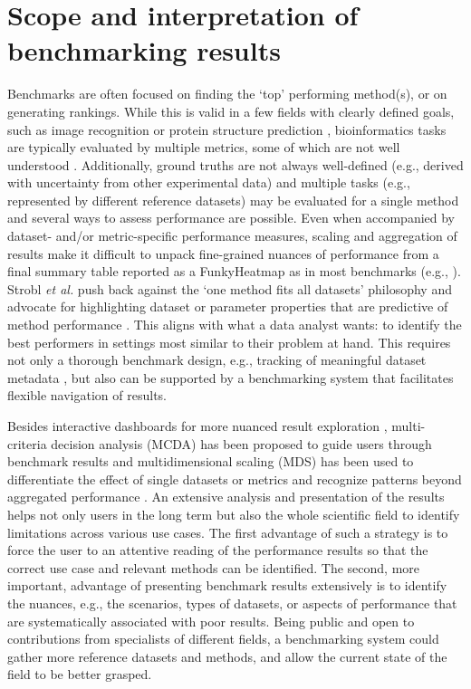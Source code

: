 \documentclass[11pt]{article}
\begin{document}
\section*{Scope and interpretation of benchmarking results}

Benchmarks are often focused on finding the `top' performing method(s), or on generating rankings. While this is valid in a few fields with clearly defined goals, such as image recognition \cite{Khan2018-ot} or protein structure prediction \cite{Jumper2021-oq}, bioinformatics tasks are typically evaluated by multiple metrics, some of which are not well understood \cite{Lutge2021-mt, Reinke2024-dw}. Additionally, ground truths are not always well-defined (e.g., derived with uncertainty from other experimental data) and multiple tasks (e.g., represented by different reference datasets) may be evaluated for a single method and several ways to assess performance are possible. Even when accompanied by dataset- and/or metric-specific performance measures, scaling and aggregation of results make it difficult to unpack fine-grained nuances of performance from a final summary table reported as a FunkyHeatmap \cite{funkyheatmap} as in most benchmarks (e.g., \cite{Saelens2019-jy}). Strobl \textit{et al.} push back against the `one method fits all datasets’ philosophy and advocate for highlighting dataset or parameter properties that are predictive of method performance \cite{Jelizarow2010-kr, Boulesteix2010-zj, Strobl2024-lp}. This aligns with what a data analyst wants: to identify the best performers in settings most similar to their problem at hand. This requires not only a thorough benchmark design, e.g., tracking of meaningful dataset metadata \cite{Strobl2024-lp}, but also can be supported by a benchmarking system that facilitates flexible navigation of results. 

Besides interactive dashboards for more nuanced result exploration \cite{bettr}, multi-criteria decision analysis (MCDA) \cite{Taherdoost2023-wd} has been proposed to guide users through benchmark results and multidimensional scaling (MDS) has been used to differentiate the effect of single datasets or metrics and recognize patterns beyond aggregated performance \cite{Niessl2022-fk}. An extensive analysis and presentation of the results helps not only users in the long term but also the whole scientific field to identify limitations across various use cases. The first advantage of such a strategy is to force the user to an attentive reading of the performance results so that the correct use case and relevant methods can be identified. The second, more important, advantage of presenting benchmark results extensively is to identify the nuances, e.g., the scenarios, types of datasets, or aspects of performance that are systematically associated with poor results. Being public and open to contributions from specialists of different fields, a benchmarking system could gather more reference datasets and methods, and allow the current state of the field to be better grasped. 
\end{document}
